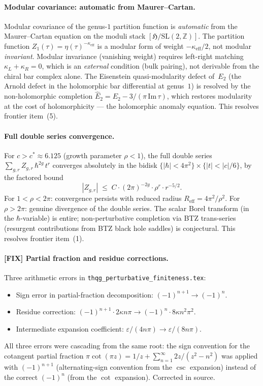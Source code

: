 \documentclass[11pt]{article}
\newcommand{\Z}{\mathbb{Z}}
\begin{document}
\paragraph{Modular covariance: automatic from Maurer--Cartan.}
Modular covariance of the genus-$1$ partition function is
\emph{automatic} from the Maurer--Cartan equation on the moduli stack
$[\mathfrak{H}/\mathrm{SL}(2,\Z)]$.  The partition function $Z_1(\tau)
= \eta(\tau)^{-\kappa_{\mathrm{eff}}}$ is a modular form of weight
$-\kappa_{\mathrm{eff}}/2$, not modular \emph{invariant}.  Modular
invariance (vanishing weight) requires left-right matching
$\kappa_L + \kappa_R = 0$, which is an \emph{external} condition (bulk
pairing), not derivable from the chiral bar complex alone.  The
Eisenstein quasi-modularity defect of~$E_2$ (the Arnold defect in the
holomorphic bar differential at genus~$1$) is resolved by the
non-holomorphic completion $\hat{E}_2 = E_2 - 3/(\pi\,\mathrm{Im}\,
\tau)$, which restores modularity at the cost of holomorphicity --- the
holomorphic anomaly equation.  This resolves frontier item~(5).

\paragraph{Full double series convergence.}
For $c > c^* \approx 6.125$ (growth parameter $\rho < 1$), the full
double series $\sum_{g,r} Z_{g,r}\,\hbar^{2g}\,t^r$ converges
absolutely in the bidisk $\{|\hbar| < 4\pi^2\} \times \{|t| < |c|/6\}$,
by the factored bound
\[
|Z_{g,r}| \;\le\; C \cdot (2\pi)^{-2g} \cdot \rho^r \cdot r^{-5/2}.
\]
For $1 < \rho < 2\pi$: convergence persists with reduced radius
$R_{\mathrm{eff}} = 4\pi^2/\rho^2$.  For $\rho > 2\pi$: genuine
divergence of the double series.  The scalar Borel transform (in the
$\hbar$-variable) is entire; non-perturbative completion via BTZ
trans-series (resurgent contributions from BTZ black hole saddles) is
conjectural.  This resolves frontier item~(1).

\paragraph{{\bfseries [FIX]} Partial fraction and residue corrections.}
Three arithmetic errors in
\texttt{thqg\_perturbative\_finiteness.tex}:
\begin{itemize}
\item Sign error in partial-fraction decomposition:
  $(-1)^{n+1} \to (-1)^n$.
\item Residue correction:
  $(-1)^{n+1} \cdot 2\kappa n\pi \to (-1)^n \cdot 8\kappa n^2 \pi^2$.
\item Intermediate expansion coefficient:
  $\varepsilon/(4n\pi) \to \varepsilon/(8n\pi)$.
\end{itemize}
All three errors were cascading from the same root: the sign convention
for the cotangent partial fraction $\pi\cot(\pi z) = 1/z +
\sum_{n=1}^\infty 2z/(z^2 - n^2)$ was applied with $(-1)^{n+1}$
(alternating-sign convention from the $\csc$ expansion) instead of the
correct $(-1)^n$ (from the $\cot$ expansion).  Corrected in source.
\end{document}
